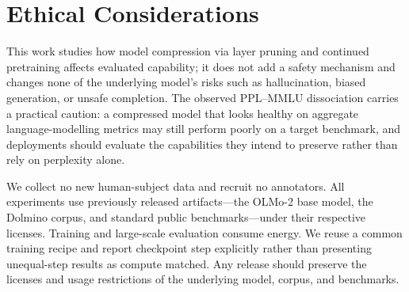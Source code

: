 \section*{Ethical Considerations}
This work studies how model compression via layer pruning and continued
pretraining affects evaluated capability; it does not add a safety mechanism and
changes none of the underlying model's risks such as hallucination, biased
generation, or unsafe completion. The observed PPL--MMLU dissociation carries a
practical caution: a compressed model that looks healthy on aggregate
language-modelling metrics may still perform poorly on a target benchmark, and
deployments should evaluate the capabilities they intend to preserve rather than
rely on perplexity alone.

We collect no new human-subject data and recruit no annotators. All experiments
use previously released artifacts---the OLMo-2 base model, the Dolmino corpus, and
standard public benchmarks---under their respective licenses. Training and
large-scale evaluation consume energy. We reuse a common training recipe and
report checkpoint step explicitly rather than presenting unequal-step results as
compute matched. Any release should preserve the licenses and usage restrictions
of the underlying model, corpus, and benchmarks.

